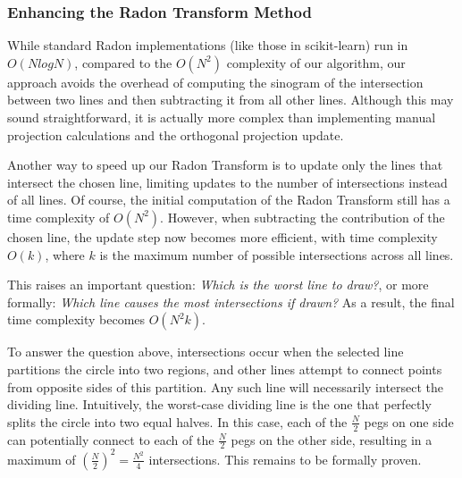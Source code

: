 \subsubsection{Enhancing the Radon Transform Method}
\label{sec:radon_improvements}

While standard Radon implementations (like those in scikit-learn) run in \(O(NlogN)\), compared to the \(O(N^2)\) complexity of our algorithm, our approach avoids the overhead of computing the sinogram of the intersection between two lines and then subtracting it from all other lines. Although this may sound straightforward, it is actually more complex than implementing manual projection calculations and the orthogonal projection update.

Another way to speed up our Radon Transform is to update only the lines that intersect the chosen line, limiting updates to the number of intersections instead of all lines. Of course, the initial computation of the Radon Transform still has a time complexity of \(O(N^2)\). However, when subtracting the contribution of the chosen line, the update step now becomes more efficient, with time complexity \(O(k)\), where \(k\) is the maximum number of possible intersections across all lines. 

This raises an important question: \textit{Which is the worst line to draw?}, or more formally: \textit{Which line causes the most intersections if drawn?} As a result, the final time complexity becomes \(O(N^2k)\).

To answer the question above, intersections occur when the selected line partitions the circle into two regions, and other lines attempt to connect points from opposite sides of this partition. Any such line will necessarily intersect the dividing line. Intuitively, the worst-case dividing line is the one that perfectly splits the circle into two equal halves. In this case, each of the \(\frac{N}{2}\) pegs on one side can potentially connect to each of the \(\frac{N}{2}\) pegs on the other side, resulting in a maximum of \((\frac{N}{2})^2 = \frac{N^2}{4}\) intersections. This remains to be formally proven.